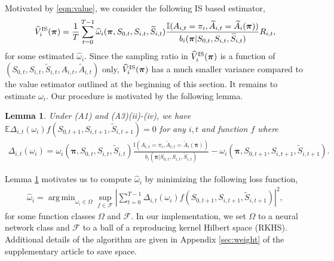 \documentclass{article}
\newcommand{\Mean}{{\mathbb{E}}}
\newtheorem{lemma}{Lemma}
\DeclareMathOperator*{\argmin}{arg\,min}
\begin{document}
Motivated by \eqref{eqn:value}, we consider the following IS based estimator,
\vspace*{-0.1cm}
\begin{eqnarray*}
	\widehat{V}^{\scriptsize{\hbox{IS}}}_i(\bm{\pi})=\frac{1}{T} \sum_{t=0}^{T-1} \widehat{\omega}_i(\bm{\pi},S_{0,t},S_{i,t},\widetilde{S}_{i,t})\frac{\mathbb{I}(A_{i,t}=\pi_i,\widetilde{A}_{i,t}=\widetilde{A}_i(\bm{\pi}))}{b_i(\bm{\pi}|S_{0,t},S_{i,t},\widetilde{S}_{i,t})}R_{i,t},
\end{eqnarray*}
for some estimated $\widehat{\omega}_i$. Since the sampling ratio in $\widehat{V}^{\scriptsize{\hbox{IS}}}_i(\bm{\pi})$ is a function of $(S_{0,t},S_{i,t},\widetilde{S}_{i,t},A_{i,t},\widetilde{A}_{i,t})$ only, $\widehat{V}^{\scriptsize{\hbox{IS}}}_i(\bm{\pi})$ has a much smaller variance compared to the value estimator outlined at the beginning of this section. It remains to estimate $\omega_i$. Our procedure is motivated by the following lemma. 

\vspace{-0.2cm}
\begin{lemma}\label{lemma:weight}
	Under (A1) and (A3)(ii)-(iv), we have $\Mean \Delta_{i,t}(\omega_i) f(S_{0,t+1},S_{i,t+1},\widetilde{S}_{i,t+1})=0$ for any $i,t$ and function $f$ where
	\vspace*{-0.2cm}
	\begin{eqnarray*}
		\Delta_{i,t}(\omega_i)=\omega_i(\bm{\pi},S_{0,t},S_{i,t},\widetilde{S}_{i,t})\frac{\mathbb{I}(A_{i,t}=\pi_i,\widetilde{A}_{i,t}=\widetilde{A}_i(\bm{\pi}))}{b_i(\bm{\pi}|S_{0,t},S_{i,t},\widetilde{S}_{i,t})}-\omega_i(\bm{\pi},S_{0,t+1},S_{i,t+1},\widetilde{S}_{i,t+1}).
	\end{eqnarray*}
\end{lemma}

Lemma \ref{lemma:weight} motivates us to compute $\widehat{\omega}_i$ by minimizing the following loss function,
\begin{eqnarray}\label{eqn:omegai}
	\widehat{\omega}_i=\argmin_{\omega_i\in \Omega} \sup_{f\in \mathcal{F}} \left|\sum_{t=0}^{T-1} \Delta_{i,t}(\omega_i) f(S_{0,t+1},S_{i,t+1},\widetilde{S}_{i,t+1})\right|^2,
\end{eqnarray}
for some function classes $\Omega$ and $\mathcal{F}$. In our implementation, we set $\Omega$ to a neural network class and $\mathcal{F}$ to a ball of a reproducing kernel Hilbert space (RKHS). Additional details of the algorithm are given in Appendix \ref{sec:weight} of the supplementary article to save space. 
\end{document}
